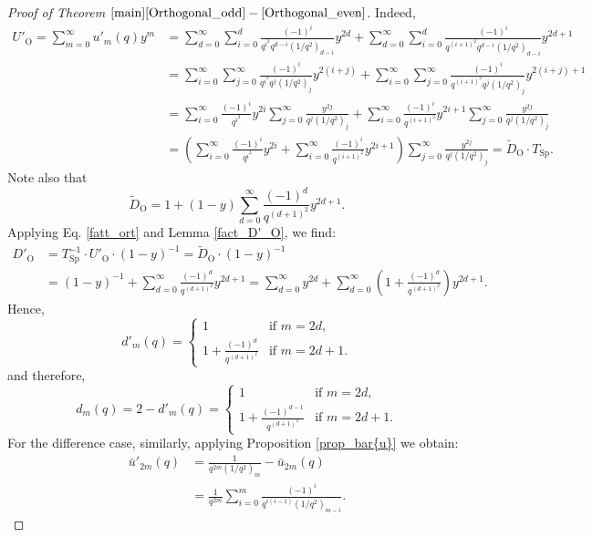 \documentclass[a4paper, 12pt, oneside]{amsart}
\theoremstyle{definition}
\DeclareMathOperator{\Sp}{Sp}
\DeclareMathOperator{\Or}{O}
\begin{document}
\begin{proof}[Proof of Theorem $\ref{main}\eqref{Orthogonal_odd}-\eqref{Orthogonal_even}$]
Indeed,
\begin{align*}
  U'_{\Or}  =\sum_{m=0}^{\infty}u'_m(q)y^m&=\sum_{d=0}^{\infty}\sum_{i=0}^{d}\frac{(-1)^{i}}{q^{i^2}q^{d-i}(1/q^2)_{d-i}}y^{2d}+\sum_{d=0}^{\infty}\sum_{i=0}^{d}\frac{(-1)^{i}}{q^{(i+1)^2}q^{d-i}(1/q^2)_{d-i}}y^{2d+1}\\
  &= \sum_{i=0}^{\infty}\sum_{j=0}^{\infty}\frac{(-1)^i}{q^{i^2}q^j(1/q^2)_j}y^{2(i+j)}+\sum_{i=0}^{\infty}\sum_{j=0}^{\infty}\frac{(-1)^i}{q^{(i+1)^2}q^j(1/q^2)_j}y^{2(i+j)+1}\\
   &= \sum_{i=0}^{\infty}\frac{(-1)^i}{q^{i^2}}y^{2i}\sum_{j=0}^{\infty}\frac{y^{2j}}{q^j(1/q^2)_j}+\sum_{i=0}^{\infty}\frac{(-1)^i}{q^{(i+1)^2}}y^{2i+1}\sum_{j=0}^{\infty}\frac{y^{2j}}{q^j(1/q^2)_j} \\
   &=\left(\sum_{i=0}^{\infty}\frac{(-1)^i}{q^{i^2}}y^{2i}+\sum_{i=0}^{\infty}\frac{(-1)^i}{q^{(i+1)^2}}y^{2i+1}\right)\sum_{j=0}^{\infty}\frac{y^{2j}}{q^j(1/q^2)_j}=\widetilde{D}_{\Or}\cdot T_{\Sp}.
\end{align*}
Note also that 
$$\widetilde{D}_{\Or}=1+(1-y)\sum_{d=0}^{\infty}\frac{(-1)^d}{q^{(d+1)^2}}y^{2d+1}.$$
Applying Eq. \eqref{fatt_ort} and
Lemma \ref{fact_D'_O}, we find: 
\begin{align*}
D'_{\Or}&=T^{-1}_{\Sp}\cdot U'_{\Or} \cdot (1-y)^{-1}= \widetilde{D}_{\Or} \cdot (1-y)^{-1} \\
&=(1-y)^{-1}+\sum_{d=0}^{\infty}\frac{(-1)^d}{q^{(d+1)^2}}y^{2d+1}=\sum_{d=0}^{\infty}y^{2d}+\sum_{d=0}^{\infty}\left(1+\frac{(-1)^d}{q^{(d+1)^2}} \right)y^{2d+1}.
\end{align*}
Hence,
$$d'_m(q)=
\begin{cases}
1 & \text{if }m=2d, \\
1+\frac{(-1)^d}{q^{(d+1)^2}} & \text{if }m=2d+1.
\end{cases}
$$
and therefore,
\begin{equation}
\label{sum}
d_m(q)=2-d'_m(q)=
\begin{cases}
1 & \text{if }m=2d, \\
1+\frac{(-1)^{d-1}}{q^{(d+1)^2}} & \text{if }m=2d+1.
\end{cases}
\end{equation}
For the difference case, similarly, applying Proposition \ref{prop_bar{u}} we obtain:
\begin{align*}
\bar{u}'_{2m}(q)& =\frac{1}{q^{2m}(1/q^2)_m}-\bar{u}_{2m}(q) \\
& =\frac{1}{q^{2m}}\sum_{i=0}^{m}\frac{(-1)^{i}}{q^{i(i-1)}(1/q^2)_{m-i}}.
\end{align*}


\end{proof}
\end{document}
